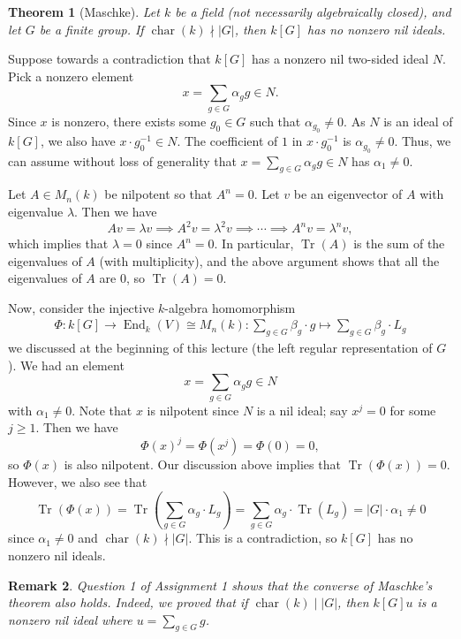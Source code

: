 \documentclass[10pt]{article}
\makeatletter
\numberwithin{equation}{section}
\DeclareMathOperator{\End}{End}
\DeclareMathOperator{\Tr}{Tr}
\DeclareMathOperator{\ch}{char}
\theoremstyle{newstyle}
\newtheorem{thm}{Theorem}[section]
\newtheorem{remark}[thm]{Remark}
\newenvironment{pf}[1][\proofname]{\par
  \pushQED{\qed}%
  \normalfont \topsep0\p@\relax
  \trivlist
  \item[\hskip\labelsep\scshape
  #1\@addpunct{.}]\ignorespaces
}{%
  \popQED\endtrivlist\@endpefalse
}
\makeatother
\begin{document}
\begin{thm}[Maschke]
Let $k$ be a field (not necessarily algebraically closed), and let $G$ be a finite group. If 
$\ch(k) \nmid |G|$, then $k[G]$ has no nonzero nil ideals. 
\end{thm}
\begin{pf}
Suppose towards a contradiction that $k[G]$ has a nonzero nil two-sided ideal $N$. Pick a nonzero 
element 
\[ x = \sum_{g \in G} \alpha_g g \in N. \]
Since $x$ is nonzero, there exists some $g_0 \in G$ such that $\alpha_{g_0} \neq 0$. As 
$N$ is an ideal of $k[G]$, we also have $x \cdot g_0^{-1} \in N$. The coefficient of $1$ in 
$x \cdot g_0^{-1}$ is $\alpha_{g_0} \neq 0$. Thus, we can assume without loss of generality that 
$x = \sum_{g \in G} \alpha_g g \in N$ has $\alpha_1 \neq 0$. 

Let $A \in M_n(k)$ be nilpotent so that $A^n = 0$. Let $v$ be an eigenvector of $A$ with eigenvalue $\lambda$. Then we have 
\[ Av = \lambda v \implies A^2v = \lambda^2v \implies \cdots \implies A^n v = \lambda^n v, \]
which implies that $\lambda = 0$ since $A^n = 0$. In particular, $\Tr(A)$ is the sum of the 
eigenvalues of $A$ (with multiplicity), and the above argument shows that all the eigenvalues of 
$A$ are $0$, so $\Tr(A) = 0$.

Now, consider the injective $k$-algebra homomorphism 
\begin{align*}
    \Phi : k[G] \to \End_k(V) \cong M_n(k) : \sum_{g \in G} \beta_g \cdot g \mapsto \sum_{g \in G} \beta_g \cdot L_g
\end{align*}
we discussed at the beginning of this lecture (the left regular representation of $G$). We had an 
element 
\[ x = \sum_{g \in G} \alpha_g g \in N \]
with $\alpha_1 \neq 0$. Note that $x$ is nilpotent since $N$ is a nil ideal; say
$x^j = 0$ for some $j \geq 1$. Then we have 
\[ \Phi(x)^j = \Phi(x^j) = \Phi(0) = 0, \]
so $\Phi(x)$ is also nilpotent. Our discussion above implies that $\Tr(\Phi(x)) = 0$. However, 
we also see that 
\[ \Tr(\Phi(x)) = \Tr\left( \sum_{g \in G} \alpha_g \cdot L_g \right)
= \sum_{g \in G} \alpha_g \cdot \Tr(L_g) = |G| \cdot \alpha_1 \neq 0 \]
since $\alpha_1 \neq 0$ and $\ch(k) \nmid |G|$. This is a contradiction, so $k[G]$ has 
no nonzero nil ideals. 
\end{pf}

\begin{remark}
Question 1 of Assignment 1 shows that the converse of Maschke's theorem also holds. Indeed, we 
proved that if $\ch(k) \mid |G|$, then $k[G]u$ is a nonzero nil ideal where $u = \sum_{g \in G} g$. 
\end{remark}
\end{document}
